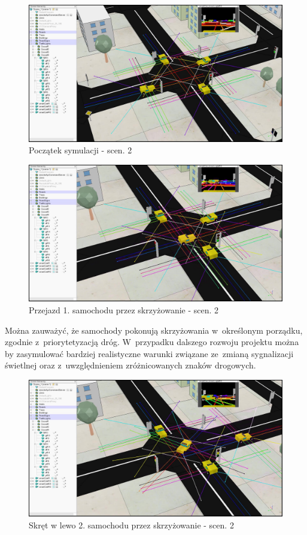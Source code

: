 \begin{figure}[H]
	\centering
	\centering
	\includegraphics[width=.8\linewidth]{p21.jpg}
	\caption{Początek symulacji - scen. 2}
	\label{fig:p21}
\end{figure}

\begin{figure}[H]
	\centering
	\centering
	\includegraphics[width=.8\linewidth]{p22.jpg}
	\caption{Przejazd 1. samochodu przez skrzyżowanie - scen. 2}
	\label{fig:p22}
\end{figure}

Można zauważyć, że samochody pokonują skrzyżowania w~określonym porządku, zgodnie z~priorytetyzacją dróg. W~przypadku dalszego rozwoju projektu można by zasymulować bardziej realistyczne warunki związane ze~zmianą sygnalizacji świetlnej oraz z~uwzględnieniem zróżnicowanych znaków drogowych. 

\begin{figure}[H]
	\centering
	\centering
	\includegraphics[width=.8\linewidth]{p23.jpg}
	\caption{Skręt w lewo 2. samochodu przez skrzyżowanie - scen. 2}
	\label{fig:p23}
\end{figure}

